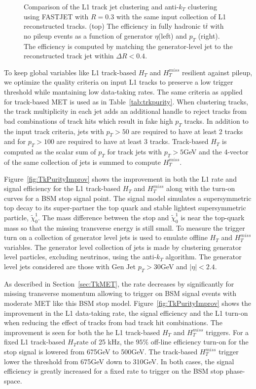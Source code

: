 \begin{figure}[htbp!]
\caption{Comparison of the L1 track jet clustering and anti-$k_{T}$ clustering using FASTJET with $R=0.3$ with the same input collection of L1 reconstructed tracks. (top) The efficiency in fully hadronic t$\overline{t}$ with no pileup events as a function of generator $\eta$(left) and $p_{T}$ (right). The efficiency is computed by matching the generator-level jet to the reconstructed track jet within $\Delta R<0.4$. }
\label{fig:TkJetEfficiency}
\end{figure}

To keep global variables like L1 track-based $H_{T}$ and $H^{miss}_{T}$ resilient against pileup, we optimize the quality criteria on input L1 tracks to preserve a low trigger threshold while mantaining low data-taking rates. The same criteria as applied for track-based MET is used as in Table~\ref{tab:trkpurity}. When clustering tracks, the track multiplicity in each jet adds an additional handle to reject tracks from bad combinations of track hits which result in fake high $p_{T}$ tracks. In addition to the input track criteria, jets with $p_{T}>50$ are required to have at least 2 tracks and for $p_{T}>100$ are required to have at least 3 tracks. Track-based $H_{T}$  is computed as the scalar sum of $p_{T}$ for track jets with $p_{T}>5$GeV and the 4-vector of the same collection of jets is summed to compute $H^{miss}_{T}$. 

Figure~\ref{fig:TkPurityImprov} shows the improvement in both the L1 rate and signal efficiency for the L1 track-based $H_{T}$ and $H^{miss}_{T}$ along with the turn-on curves for a BSM stop signal point. The signal model simulates a supersymmetric top decay to its super-partner the top quark and stable lightest supersymmetric particle, $\tilde{\chi}^{1}_{0}$. The mass difference between the stop and $\tilde{\chi}^{1}_{0}$ is near the top-quark mass so that the missing transverse energy is still small. To measure the trigger turn on a collection of generator level jets is used to emulate offline  $H_{T}$ and $H^{miss}_{T}$ variables. The generator level collection of jets is made by clustering generator level particles, excluding neutrinos, using the anti-$k_{T}$ algorithm. The generator level jets considered are those with Gen Jet $p_{T}>30$GeV and $\vert\eta\vert<2.4$. 

As described in Section~\ref{sec:TkMET}, the rate decreases by significantly for missing transverse momentum allowing to trigger on BSM signal events with moderate MET like this BSM stop model. Figure~\ref{fig:TkPurityImprov} shows the improvement in the L1 data-taking rate, the signal efficiency and the L1 turn-on when reducing the effect of tracks from bad track hit combinations. The improvement is seen for both the he L1 track-based $H_{T}$ and  $H^{miss}_{T}$ triggers. For a fixed L1 track-based $H_{T}$rate of 25 kHz, the $95\%$ off-line efficiency turn-on for the stop signal is lowered from 675GeV to 500GeV. The track-based $H^{miss}_{T}$  trigger lower the threshold from 675GeV down to 310GeV. In both cases, the signal efficiency is greatly increased for a fixed rate to trigger on the BSM stop phase-space.

